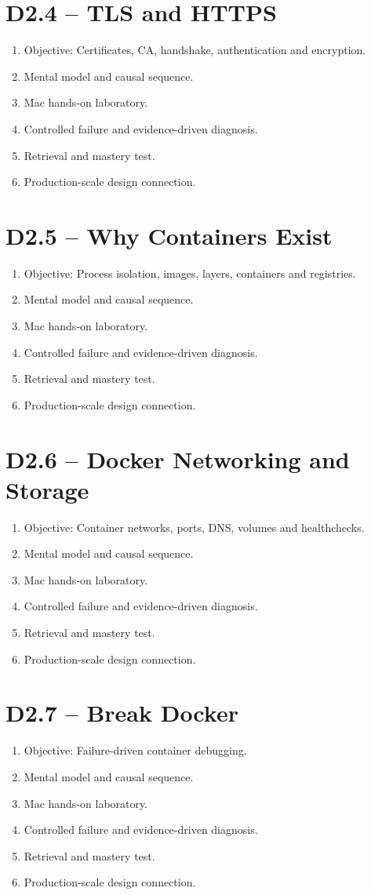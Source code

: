 \documentclass[11pt,a4paper]{book}
\begin{document}
\section{D2.4 -- TLS and HTTPS}
\begin{enumerate}
\item Objective: Certificates, CA, handshake, authentication and encryption.
\item Mental model and causal sequence.
\item Mac hands-on laboratory.
\item Controlled failure and evidence-driven diagnosis.
\item Retrieval and mastery test.
\item Production-scale design connection.
\end{enumerate}
\section{D2.5 -- Why Containers Exist}
\begin{enumerate}
\item Objective: Process isolation, images, layers, containers and registries.
\item Mental model and causal sequence.
\item Mac hands-on laboratory.
\item Controlled failure and evidence-driven diagnosis.
\item Retrieval and mastery test.
\item Production-scale design connection.
\end{enumerate}
\section{D2.6 -- Docker Networking and Storage}
\begin{enumerate}
\item Objective: Container networks, ports, DNS, volumes and healthchecks.
\item Mental model and causal sequence.
\item Mac hands-on laboratory.
\item Controlled failure and evidence-driven diagnosis.
\item Retrieval and mastery test.
\item Production-scale design connection.
\end{enumerate}
\section{D2.7 -- Break Docker}
\begin{enumerate}
\item Objective: Failure-driven container debugging.
\item Mental model and causal sequence.
\item Mac hands-on laboratory.
\item Controlled failure and evidence-driven diagnosis.
\item Retrieval and mastery test.
\item Production-scale design connection.
\end{enumerate}
\end{document}

